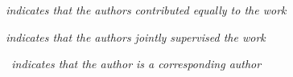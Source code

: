 

%
%
%

{\small 
\noindent \emph{~\cofirst indicates that the authors contributed equally to the work}

\noindent \emph{~\colast indicates that the authors jointly supervised the work}

\noindent \emph{~\corresponding ~indicates that the author is a corresponding author}
}

\vspace{0.4cm}


